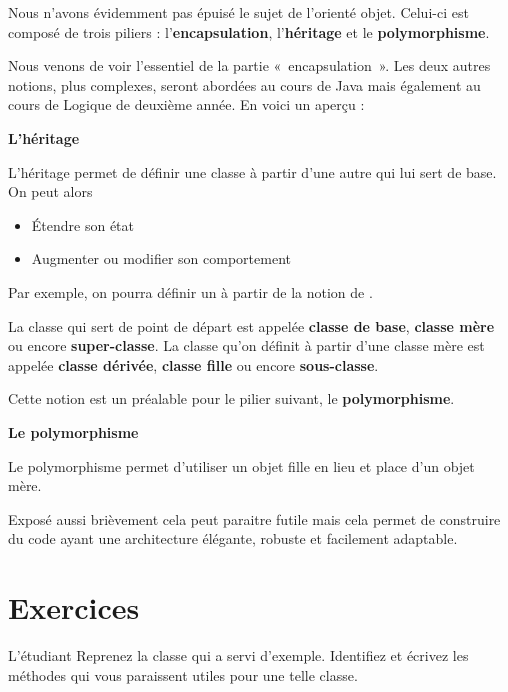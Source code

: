 Nous n'avons évidemment pas épuisé le sujet de
l'orienté objet. Celui-ci est composé de trois piliers
: l'\textbf{encapsulation},
l'\textbf{héritage} et le \textbf{polymorphisme}.

Nous venons de voir l'essentiel de la partie
«~encapsulation~». Les deux autres notions, plus complexes, seront
abordées au cours de Java mais également au cours de Logique de
deuxième année. En voici un aperçu :

{\sffamily\bfseries\upshape
L'héritage}

{L’héritage permet de définir une classe à partir d’une autre qui lui
sert de base.} 
{On peut alors}

\liststyleListv
\begin{itemize}
	\item {
		Étendre son état}
	\item {
		Augmenter ou modifier son comportement}
\end{itemize}

Par exemple, on pourra définir un  à partir
de la notion de .

La classe qui sert de point de départ est appelée \textbf{classe de
base}, \textbf{classe mère} ou encore \textbf{super-classe}. La classe
qu’on définit à partir d’une classe mère est appelée \textbf{classe
dérivée}, \textbf{classe fille} ou encore \textbf{sous-classe}.

Cette notion est un préalable pour le pilier suivant, le
\textbf{polymorphisme}.

{\sffamily\bfseries\upshape
Le polymorphisme}

{
Le polymorphisme permet d’utiliser un objet fille en lieu et place d’un
objet mère.} 

{Exposé aussi brièvement cela peut paraitre futile mais cela
permet de construire du code ayant une architecture élégante, robuste
et facilement adaptable.}


\section{Exercices}

\begin{Exercice}{L'étudiant}
	Reprenez la classe  qui a servi
	d'exemple. Identifiez et écrivez les méthodes qui vous
	paraissent utiles pour une telle classe.
\end{Exercice}

